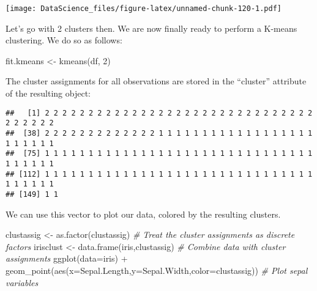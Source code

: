 \documentclass[
]{book}
\newenvironment{Shaded}{\begin{snugshade}}{\end{snugshade}}
\newcommand{\AttributeTok}[1]{\textcolor[rgb]{0.77,0.63,0.00}{#1}}
\newcommand{\CommentTok}[1]{\textcolor[rgb]{0.56,0.35,0.01}{\textit{#1}}}
\newcommand{\DecValTok}[1]{\textcolor[rgb]{0.00,0.00,0.81}{#1}}
\newcommand{\FunctionTok}[1]{\textcolor[rgb]{0.00,0.00,0.00}{#1}}
\newcommand{\NormalTok}[1]{#1}
\newcommand{\OtherTok}[1]{\textcolor[rgb]{0.56,0.35,0.01}{#1}}
\newcommand{\SpecialCharTok}[1]{\textcolor[rgb]{0.00,0.00,0.00}{#1}}
\begin{document}
\texttt{[image: DataScience\_files/figure-latex/unnamed-chunk-120-1.pdf]}

Let's go with 2 clusters then. We are now finally ready to perform a K-means clustering. We do so as follows:

\begin{Shaded}
\begin{Highlighting}[]
\NormalTok{fit.kmeans }\OtherTok{\textless{}{-}} \FunctionTok{kmeans}\NormalTok{(df, }\DecValTok{2}\NormalTok{)}
\end{Highlighting}
\end{Shaded}

The cluster assignments for all observations are stored in the ``cluster'' attribute of the resulting object:

\begin{Shaded}
\end{Shaded}

\begin{verbatim}
##   [1] 2 2 2 2 2 2 2 2 2 2 2 2 2 2 2 2 2 2 2 2 2 2 2 2 2 2 2 2 2 2 2 2 2 2 2 2 2
##  [38] 2 2 2 2 2 2 2 2 2 2 2 2 2 1 1 1 1 1 1 1 1 1 1 1 1 1 1 1 1 1 1 1 1 1 1 1 1
##  [75] 1 1 1 1 1 1 1 1 1 1 1 1 1 1 1 1 1 1 1 1 1 1 1 1 1 1 1 1 1 1 1 1 1 1 1 1 1
## [112] 1 1 1 1 1 1 1 1 1 1 1 1 1 1 1 1 1 1 1 1 1 1 1 1 1 1 1 1 1 1 1 1 1 1 1 1 1
## [149] 1 1
\end{verbatim}

We can use this vector to plot our data, colored by the resulting clusters.

\begin{Shaded}
\begin{Highlighting}[]
\NormalTok{clustassig }\OtherTok{\textless{}{-}} \FunctionTok{as.factor}\NormalTok{(clustassig) }\CommentTok{\# Treat the cluster assignments as discrete factors}
\NormalTok{irisclust }\OtherTok{\textless{}{-}} \FunctionTok{data.frame}\NormalTok{(iris,clustassig) }\CommentTok{\# Combine data with cluster assignments}
\FunctionTok{ggplot}\NormalTok{(}\AttributeTok{data=}\NormalTok{iris) }\SpecialCharTok{+} \FunctionTok{geom\_point}\NormalTok{(}\FunctionTok{aes}\NormalTok{(}\AttributeTok{x=}\NormalTok{Sepal.Length,}\AttributeTok{y=}\NormalTok{Sepal.Width,}\AttributeTok{color=}\NormalTok{clustassig)) }\CommentTok{\# Plot sepal variables}
\end{Highlighting}
\end{Shaded}
\end{document}

